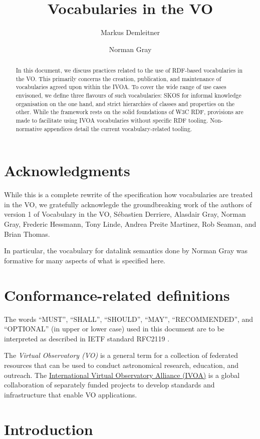 \documentclass[11pt,a4paper]{ivoa}
\title{Vocabularies in the VO}
\author[https://wiki.ivoa.net/twiki/bin/view/IVOA/MarkusDemleitner]{Markus
Demleitner}
\author[https://wiki.ivoa.net/twiki/bin/view/IVOA/NormanGray]{Norman
Gray}
\begin{document}
\begin{abstract}
In this document, we discuss practices related to the use of RDF-based
vocabularies in the VO.  This primarily concerns the creation,
publication, and maintenance of vocabularies agreed upon within the IVOA.
To cover the wide range of use cases envisoned, we define three flavours
of such vocabularies: SKOS for informal knowledge organisation on the
one hand, and strict hierarchies of classes and properties on the other.
While the framework rests on the solid foundations of W3C RDF,
provisions are made to facilitate using IVOA vocabularies without
specific RDF tooling.
Non-normative appendices detail the current vocabulary-related tooling.
\end{abstract}


\section*{Acknowledgments}

While this is a complete rewrite of the specification how vocabularies
are treated in the VO, we gratefully acknowlegde the groundbreaking work
of the authors of version 1 of Vocabulary in the VO, S\'ebastien
Derriere, Alasdair Gray, Norman Gray, Frederic Hessmann, Tony Linde,
Andrea Preite Martinez, Rob Seaman, and Brian Thomas.

In particular, the vocabulary for datalink semantics done by Norman Gray
was formative for many aspects of what is specified here.

\section*{Conformance-related definitions}

The words ``MUST'', ``SHALL'', ``SHOULD'', ``MAY'', ``RECOMMENDED'', and
``OPTIONAL'' (in upper or lower case) used in this document are to be
interpreted as described in IETF standard RFC2119 \citep{std:RFC2119}.

The \emph{Virtual Observatory (VO)} is a
general term for a collection of federated resources that can be used
to conduct astronomical research, education, and outreach.
The \href{http://www.ivoa.net}{International
Virtual Observatory Alliance (IVOA)} is a global
collaboration of separately funded projects to develop standards and
infrastructure that enable VO applications.

\section{Introduction}
\end{document}
